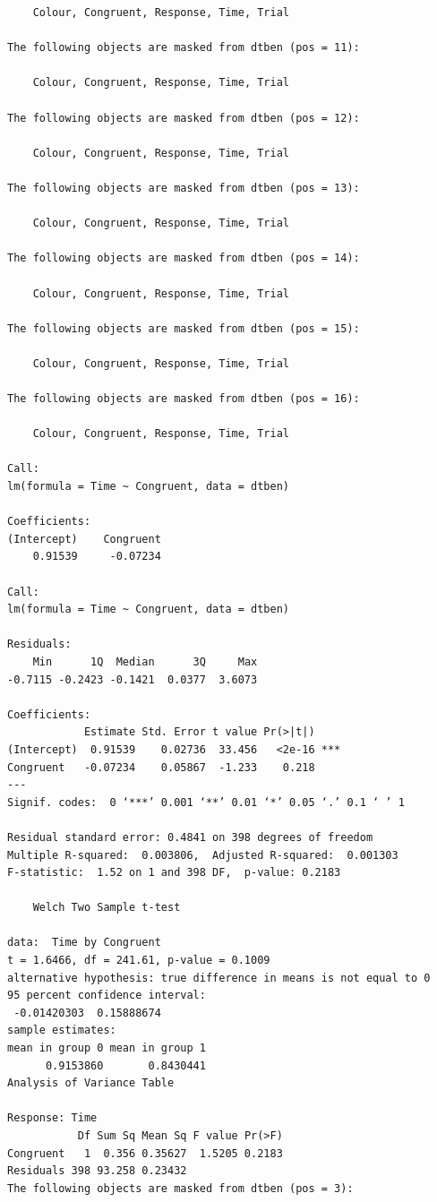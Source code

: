 \documentclass{article}
\begin{document}
\begin{verbatim}
    Colour, Congruent, Response, Time, Trial

The following objects are masked from dtben (pos = 11):

    Colour, Congruent, Response, Time, Trial

The following objects are masked from dtben (pos = 12):

    Colour, Congruent, Response, Time, Trial

The following objects are masked from dtben (pos = 13):

    Colour, Congruent, Response, Time, Trial

The following objects are masked from dtben (pos = 14):

    Colour, Congruent, Response, Time, Trial

The following objects are masked from dtben (pos = 15):

    Colour, Congruent, Response, Time, Trial

The following objects are masked from dtben (pos = 16):

    Colour, Congruent, Response, Time, Trial

Call:
lm(formula = Time ~ Congruent, data = dtben)

Coefficients:
(Intercept)    Congruent  
    0.91539     -0.07234

Call:
lm(formula = Time ~ Congruent, data = dtben)

Residuals:
    Min      1Q  Median      3Q     Max 
-0.7115 -0.2423 -0.1421  0.0377  3.6073 

Coefficients:
            Estimate Std. Error t value Pr(>|t|)    
(Intercept)  0.91539    0.02736  33.456   <2e-16 ***
Congruent   -0.07234    0.05867  -1.233    0.218    
---
Signif. codes:  0 ‘***’ 0.001 ‘**’ 0.01 ‘*’ 0.05 ‘.’ 0.1 ‘ ’ 1

Residual standard error: 0.4841 on 398 degrees of freedom
Multiple R-squared:  0.003806,	Adjusted R-squared:  0.001303 
F-statistic:  1.52 on 1 and 398 DF,  p-value: 0.2183

	Welch Two Sample t-test

data:  Time by Congruent
t = 1.6466, df = 241.61, p-value = 0.1009
alternative hypothesis: true difference in means is not equal to 0
95 percent confidence interval:
 -0.01420303  0.15888674
sample estimates:
mean in group 0 mean in group 1 
      0.9153860       0.8430441
Analysis of Variance Table

Response: Time
           Df Sum Sq Mean Sq F value Pr(>F)
Congruent   1  0.356 0.35627  1.5205 0.2183
Residuals 398 93.258 0.23432
The following objects are masked from dtben (pos = 3):


\end{verbatim}
\end{document}

